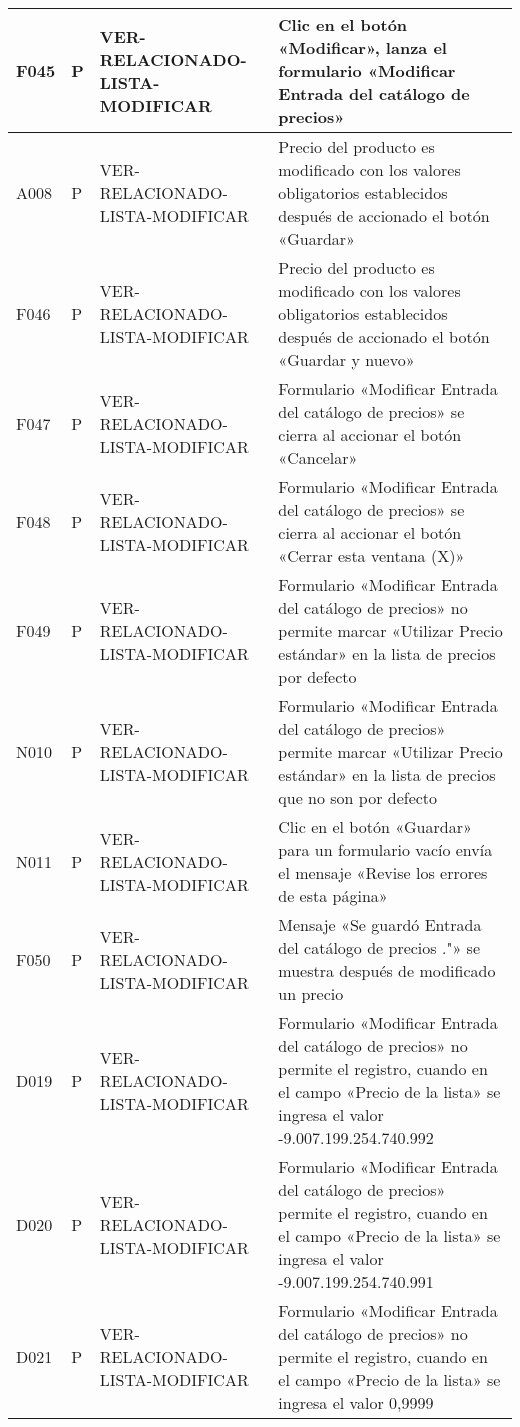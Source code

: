 \begin{landscape}
\begin{longtable}[htb]{|l|l|p{5.0cm}|p{13.0cm}|}
F045 & P & VER-RELACIONADO-LISTA-MODIFICAR & Clic en el botón «Modificar», lanza el formulario «Modificar Entrada del catálogo de precios» \\ \hline
A008 & P & VER-RELACIONADO-LISTA-MODIFICAR & Precio del producto es modificado con los valores obligatorios establecidos después de accionado el botón «Guardar» \\ \hline
F046 & P & VER-RELACIONADO-LISTA-MODIFICAR & Precio del producto es modificado con los valores obligatorios establecidos después de accionado el botón «Guardar y nuevo» \\ \hline
F047 & P & VER-RELACIONADO-LISTA-MODIFICAR & Formulario «Modificar Entrada del catálogo de precios» se cierra al accionar el botón «Cancelar» \\ \hline
F048 & P & VER-RELACIONADO-LISTA-MODIFICAR & Formulario «Modificar Entrada del catálogo de precios» se cierra al accionar el botón «Cerrar esta ventana (X)» \\ \hline
F049 & P & VER-RELACIONADO-LISTA-MODIFICAR & Formulario «Modificar Entrada del catálogo de precios» no permite marcar «Utilizar Precio estándar» en la lista de precios por defecto \\ \hline
N010 & P & VER-RELACIONADO-LISTA-MODIFICAR & Formulario «Modificar Entrada del catálogo de precios» permite marcar «Utilizar Precio estándar» en la lista de precios que no son por defecto \\ \hline
N011 & P & VER-RELACIONADO-LISTA-MODIFICAR & Clic en el botón «Guardar» para un formulario vacío envía el mensaje «Revise los errores de esta página» \\ \hline
F050 & P & VER-RELACIONADO-LISTA-MODIFICAR & Mensaje «Se guardó Entrada del catálogo de precios ."» se muestra después de modificado un precio \\ \hline
D019 & P & VER-RELACIONADO-LISTA-MODIFICAR & Formulario «Modificar Entrada del catálogo de precios» no permite el registro, cuando en el campo «Precio de la lista» se ingresa el valor -9.007.199.254.740.992 \\ \hline
D020 & P & VER-RELACIONADO-LISTA-MODIFICAR & Formulario «Modificar Entrada del catálogo de precios» permite el registro, cuando en el campo «Precio de la lista» se ingresa el valor -9.007.199.254.740.991 \\ \hline
D021 & P & VER-RELACIONADO-LISTA-MODIFICAR & Formulario «Modificar Entrada del catálogo de precios» no permite el registro, cuando en el campo «Precio de la lista» se ingresa el valor 0,9999 \\ \hline

\end{longtable}
\end{landscape}
